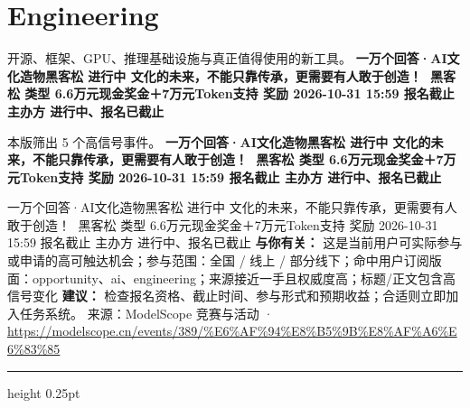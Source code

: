 \documentclass[10.5pt]{ctexart}
\begin{document}
\section*{Engineering}
{\color{ormuted} 开源、框架、GPU、推理基础设施与真正值得使用的新工具。}
\vspace{2mm}
{\LARGE\bfseries 一万个回答·AI文化造物黑客松 进行中 文化的未来，不能只靠传承，更需要有人敢于创造！👋 黑客松 类型 6.6万元现金奖金＋7万元Token支持 奖励 2026-10-31 15:59 报名截止 主办方 进行中、报名已截止}\par
\vspace{1mm}
{\color{ormuted} 本版筛出 5 个高信号事件。}
\vspace{3mm}
{\Large\bfseries 一万个回答·AI文化造物黑客松 进行中 文化的未来，不能只靠传承，更需要有人敢于创造！👋 黑客松 类型 6.6万元现金奖金＋7万元Token支持 奖励 2026-10-31 15:59 报名截止 主办方 进行中、报名已截止}\par
一万个回答·AI文化造物黑客松 进行中 文化的未来，不能只靠传承，更需要有人敢于创造！👋 黑客松 类型 6.6万元现金奖金＋7万元Token支持 奖励 2026-10-31 15:59 报名截止 主办方 进行中、报名已截止
\textbf{与你有关：} 这是当前用户可实际参与或申请的高可触达机会；参与范围：全国 / 线上 / 部分线下；命中用户订阅版面：opportunity、ai、engineering；来源接近一手且权威度高；标题/正文包含高信号变化
\textbf{建议：} 检查报名资格、截止时间、参与形式和预期收益；合适则立即加入任务系统。
{\footnotesize\color{ormuted} 来源：ModelScope 竞赛与活动 · \url{https://modelscope.cn/events/389/%E6%AF%94%E8%B5%9B%E8%AF%A6%E6%83%85}}
\vspace{4mm}
\hrule height 0.25pt
\vspace{3mm}
\end{document}
